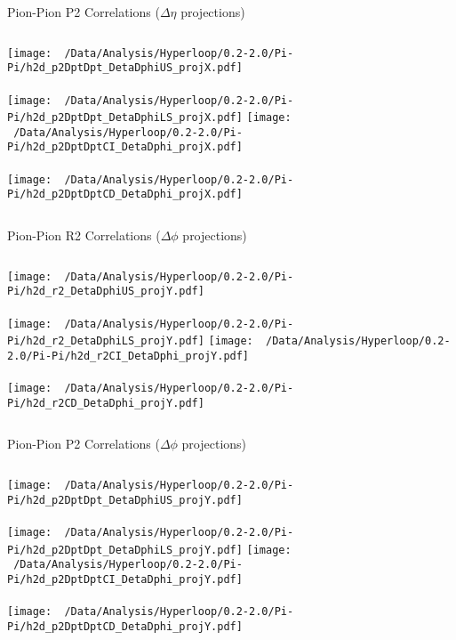 \documentclass{beamer}
\begin{document}
\begin{frame}{Pion-Pion P2 Correlations ($\Delta\eta$ projections)}
	\begin{columns}
		\centering
		\texttt{[image: ~/Data/Analysis/Hyperloop/0.2-2.0/Pi-Pi/h2d\_p2DptDpt\_DetaDphiUS\_projX.pdf]}\\~\\
		\texttt{[image: ~/Data/Analysis/Hyperloop/0.2-2.0/Pi-Pi/h2d\_p2DptDpt\_DetaDphiLS\_projX.pdf]}
		\centering
		\texttt{[image: ~/Data/Analysis/Hyperloop/0.2-2.0/Pi-Pi/h2d\_p2DptDptCI\_DetaDphi\_projX.pdf]}\\~\\
		\texttt{[image: ~/Data/Analysis/Hyperloop/0.2-2.0/Pi-Pi/h2d\_p2DptDptCD\_DetaDphi\_projX.pdf]}
	\end{columns}
\end{frame}
\begin{frame}{Pion-Pion R2 Correlations ($\Delta\phi$ projections)}
	\begin{columns}
		\column{0.5\linewidth}
		\centering
		\texttt{[image: ~/Data/Analysis/Hyperloop/0.2-2.0/Pi-Pi/h2d\_r2\_DetaDphiUS\_projY.pdf]}\\~\\
		\texttt{[image: ~/Data/Analysis/Hyperloop/0.2-2.0/Pi-Pi/h2d\_r2\_DetaDphiLS\_projY.pdf]}
		\column{0.5\linewidth}
		\centering
		\texttt{[image: ~/Data/Analysis/Hyperloop/0.2-2.0/Pi-Pi/h2d\_r2CI\_DetaDphi\_projY.pdf]}\\~\\
		\texttt{[image: ~/Data/Analysis/Hyperloop/0.2-2.0/Pi-Pi/h2d\_r2CD\_DetaDphi\_projY.pdf]}
	\end{columns}
\end{frame}
\begin{frame}{Pion-Pion P2 Correlations ($\Delta\phi$ projections)}
	\begin{columns}
		\centering
		\texttt{[image: ~/Data/Analysis/Hyperloop/0.2-2.0/Pi-Pi/h2d\_p2DptDpt\_DetaDphiUS\_projY.pdf]}\\~\\
		\texttt{[image: ~/Data/Analysis/Hyperloop/0.2-2.0/Pi-Pi/h2d\_p2DptDpt\_DetaDphiLS\_projY.pdf]}
		\centering
		\texttt{[image: ~/Data/Analysis/Hyperloop/0.2-2.0/Pi-Pi/h2d\_p2DptDptCI\_DetaDphi\_projY.pdf]}\\~\\
		\texttt{[image: ~/Data/Analysis/Hyperloop/0.2-2.0/Pi-Pi/h2d\_p2DptDptCD\_DetaDphi\_projY.pdf]}
	\end{columns}
\end{frame}
\end{document}
